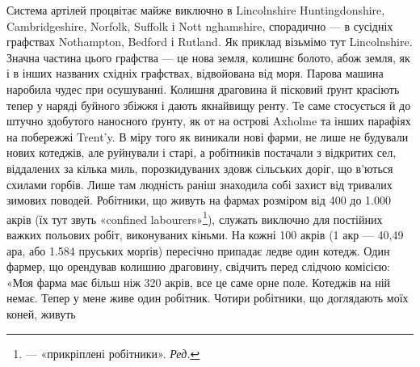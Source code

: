 Система артілей процвітає майже виключно в Lincolnshire
Huntingdonshire, Cambridgeshire, Norfolk, Suffolk і Nott nghamshire,
спорадично — в сусідніх графствах Nothampton, Bedford
і Rutland. Як приклад візьмімо тут Lincolnshire. Значна
частина цього графства — це нова земля, колишнє болото, абож
земля, як і в інших названих східніх графствах, відвойована від
моря. Парова машина наробила чудес при осушуванні. Колишня
драговина й пісковий ґрунт красіють тепер у наряді буйного
збіжжя і дають якнайвищу ренту. Те саме стосується й до штучно
здобутого наносного ґрунту, як от на острові Axholme та інших
парафіях на побережжі Trent’y. В міру того як виникали нові
фарми, не лише не будували нових котеджів, але руйнували і
старі, а робітників постачали з відкритих сел, віддалених за
кілька миль, порозкидуваних здовж сільських доріг, що в’ються
схилами горбів. Лише там людність раніш знаходила собі захист
від тривалих зимових поводей. Робітники, що живуть на фармах
розміром від 400 до \num{1.000} акрів (їх тут звуть «confined labourers»\footnote*{
— «прикріплені робітники». \emph{Ред.}
}),
служать виключно для постійних важких польових робіт, виконуваних
кіньми. На кожні 100 акрів (1 акр — 40,49 ара, або
\num{1.584} пруських морґів) пересічно припадає ледве один котедж.
Один фармер, що орендував колишню драговину, свідчить перед
слідчою комісією: «Моя фарма має більш ніж 320 акрів, все це
саме орне поле. Котеджів на ній немає. Тепер у мене живе один
робітник. Чотири робітники, що доглядають моїх коней, живуть
\parbreak{}  %
